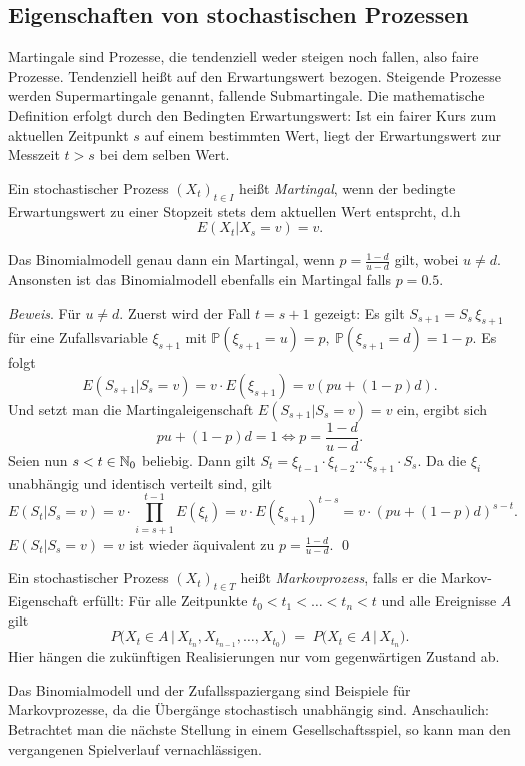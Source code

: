 \subsection{Eigenschaften von stochastischen Prozessen}

\begin{defi}[Martingal]
Martingale sind Prozesse, die tendenziell weder steigen noch fallen, 
also faire Prozesse. Tendenziell heißt auf den Erwartungswert bezogen. 
Steigende Prozesse werden Supermartingale genannt, fallende Submartingale. 
Die mathematische Definition erfolgt durch den Bedingten Erwartungswert: 
Ist ein fairer Kurs zum aktuellen Zeitpunkt $s$ auf einem bestimmten Wert, 
liegt der Erwartungswert zur Messzeit $t \gt s$ bei dem selben Wert.

Ein stochastischer Prozess $(X_t)_{t \in I}$ heißt \textit{Martingal}, 
wenn der bedingte Erwartungswert zu einer Stopzeit stets dem aktuellen Wert entsprcht, d.h $$E(X_t|X_s=v) = v.$$
\end{defi}

\begin{bsp}
Das Binomialmodell genau dann ein Martingal, wenn $p=\frac{1-d}{u-d}$ gilt, wobei $u \neq d$. 
Ansonsten ist das Binomialmodell ebenfalls ein Martingal falls $p=0.5$.

\textit{Beweis}. Für $u \neq d$.
Zuerst wird der Fall $t = s + 1$ gezeigt:
Es gilt $S_{s+1}=S_s\,\xi_{s+1}$ für eine Zufallsvariable $\xi_{s+1}$ mit $\mathbb{P}(\xi_{s+1}=u)=p,\ \mathbb{P}(\xi_{s+1}=d)=1-p$. Es folgt
$$E(S_{s+1}|S_s=v)= v \cdot E(\xi_{s+1})=v(pu+(1-p)d).$$
Und setzt man die Martingaleigenschaft $E(S_{s+1}|S_s=v)=v$ ein, ergibt sich
$$pu+(1-p)d=1 \iff p=\frac{1-d}{u-d}.$$
Seien nun $s < t \in \Bbb N_0$ beliebig. Dann gilt $S_t=\xi_{t-1}\cdot \xi_{t-2}\cdots \xi_{s+1}\cdot S_s$. 
Da die $\xi_i$ unabhängig und identisch verteilt sind, gilt
$$E(S_t|S_s=v)=v \cdot \prod_{i=s+1}^{t-1} E(\xi_t)=v \cdot E(\xi_{s+1})^{t-s}=v \cdot (pu+(1-p)d)^{s-t}.$$
$E(S_t|S_s=v)=v$ ist wieder äquivalent zu $p=\frac{1-d}{u-d}$. \qed
\end{bsp}

\begin{defi}[Markovprozess]
Ein stochastischer Prozess $(X_t)_{t \in T}$
heißt \emph{Markovprozess}, falls er die Markov-Eigenschaft erfüllt:  
Für alle Zeitpunkte $t_0 < t_1 < \dots < t_n < t$ und alle Ereignisse $A$ gilt
$$
  P\!\bigl( X_t \in A \,\big|\, X_{t_n}, X_{t_{n-1}}, \dots, X_{t_0} \bigr)
  \;=\;
  P\!\bigl( X_t \in A \,\big|\, X_{t_n} \bigr).
$$
Hier hängen die zukünftigen Realisierungen nur vom gegenwärtigen Zustand ab.
\end{defi}

\begin{bsp}
Das Binomialmodell und der Zufallsspaziergang sind Beispiele für Markovprozesse, da die Übergänge stochastisch unabhängig sind. Anschaulich: Betrachtet man die nächste Stellung in einem Gesellschaftsspiel, so kann man den vergangenen Spielverlauf vernachlässigen.
\end{bsp}